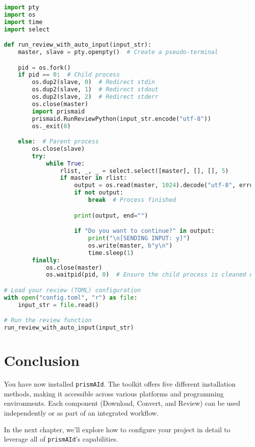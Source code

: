 \begin{commandbox}
\begin{lstlisting}[language=Python]
import pty
import os
import time
import select

def run_review_with_auto_input(input_str):
    master, slave = pty.openpty()  # Create a pseudo-terminal

    pid = os.fork()
    if pid == 0:  # Child process
        os.dup2(slave, 0)  # Redirect stdin
        os.dup2(slave, 1)  # Redirect stdout
        os.dup2(slave, 2)  # Redirect stderr
        os.close(master)
        import prismaid
        prismaid.RunReviewPython(input_str.encode("utf-8"))
        os._exit(0)

    else:  # Parent process
        os.close(slave)
        try:
            while True:
                rlist, _, _ = select.select([master], [], [], 5)
                if master in rlist:
                    output = os.read(master, 1024).decode("utf-8", errors="ignore")
                    if not output:
                        break  # Process finished

                    print(output, end="")

                    if "Do you want to continue?" in output:
                        print("\n[SENDING INPUT: y]")
                        os.write(master, b"y\n")
                        time.sleep(1)
        finally:
            os.close(master)
            os.waitpid(pid, 0)  # Ensure the child process is cleaned up

# Load your review (TOML) configuration
with open("config.toml", "r") as file:
    input_str = file.read()

# Run the review function
run_review_with_auto_input(input_str)
\end{lstlisting}
\end{commandbox}

\section{Conclusion}

You have now installed \texttt{prismAId}. The toolkit offers five different installation methods, making it accessible across various platforms and programming environments. Each component (Download, Convert, and Review) can be used independently or as part of an integrated workflow.

In the next chapter, we'll explore how to configure your project in detail to leverage all of \texttt{prismAId}'s capabilities.
